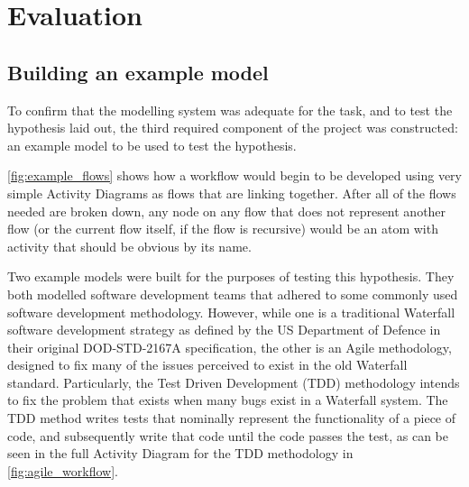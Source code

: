 
\chapter{Evaluation}
\label{evaluation}

\section{Building an example model}
To confirm that the modelling system was adequate for the task, and to test the hypothesis laid out, the third required component of the project was constructed: an example model to be used to test the hypothesis. \par

\cref{fig:example_flows} shows how a workflow would begin to be developed using very simple Activity Diagrams as flows that are linking together. After all of the flows needed are broken down, any node on any flow that does not represent another flow (or the current flow itself, if the flow is recursive) would be an atom with activity that should be obvious by its name. \par

Two example models were built for the purposes of testing this hypothesis. They both modelled software development teams that adhered to some commonly used software development methodology. However, while one is a traditional Waterfall software development strategy as defined by the US Department of Defence in their original DOD-STD-2167A specification\cite{DEPARTAMENTOFDEFENSE1984}, the other is an Agile methodology, designed to fix many of the issues perceived to exist in the old Waterfall standard. Particularly, the Test Driven Development (TDD) methodology intends to fix the problem that exists when many bugs exist in a Waterfall system. The TDD method writes tests that nominally represent the functionality of a piece of code, and subsequently write that code until the code passes the test, as can be seen in the full Activity Diagram for the TDD methodology in \cref{fig:agile_workflow}. \par
    
